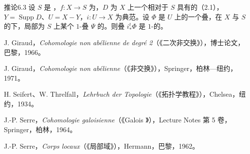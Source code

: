 \begin{SGAresult}{推论}{6.3}
设 $S$ 是 ，$f:X\to S$ 为，$D$ 为 $X$ 上一个相对于 $S$ 具有的（2.1），$Y=\operatorname{Supp}D$、$U=X-Y$，$i:U\to X$ 为典范。设 $\Phi$ 是 $U$ 上的一个叠，在 $X$ 与 $S$ 的下，局部为 $S$ 上某个 $1$-叠 $\Psi$ 的。则叠 $i_*^t\Phi$ 是 $1$-的。
\end{SGAresult}

\begin{enumerate}[label={[\arabic*]},leftmargin=2em]
\item J. Giraud，\textit{Cohomologie non abélienne de degré 2}（《二次非交换》），博士论文，巴黎，1966。
\item J. Giraud，\textit{Cohomologie non abélienne}（《非交换》），Springer，柏林—纽约，1971。
\item H. Seifert、W. Threlfall，\textit{Lehrbuch der Topologie}（《拓扑学教程》），Chelsea，纽约，1934。
\item J.-P. Serre，\textit{Cohomologie galoisienne}（《Galois 》），Lecture Notes 第 5 卷，Springer，柏林，1964。
\item J.-P. Serre，\textit{Corps locaux}（《局部域》），Hermann，巴黎，1962。
\end{enumerate}
